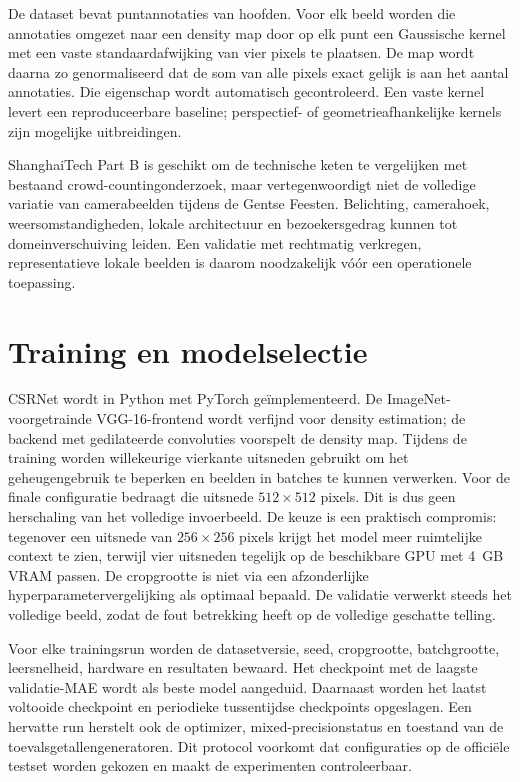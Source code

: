 De dataset bevat puntannotaties van hoofden. Voor elk beeld worden die annotaties omgezet naar een density map door op elk punt een Gaussische kernel met een vaste standaardafwijking van vier pixels te plaatsen. De map wordt daarna zo genormaliseerd dat de som van alle pixels exact gelijk is aan het aantal annotaties. Die eigenschap wordt automatisch gecontroleerd. Een vaste kernel levert een reproduceerbare baseline; perspectief- of geometrieafhankelijke kernels zijn mogelijke uitbreidingen.

ShanghaiTech Part B is geschikt om de technische keten te vergelijken met bestaand crowd-countingonderzoek, maar vertegenwoordigt niet de volledige variatie van camerabeelden tijdens de Gentse Feesten. Belichting, camerahoek, weersomstandigheden, lokale architectuur en bezoekersgedrag kunnen tot domeinverschuiving leiden. Een validatie met rechtmatig verkregen, representatieve lokale beelden is daarom noodzakelijk vóór een operationele toepassing.

\section{Training en modelselectie}

CSRNet wordt in Python met PyTorch geïmplementeerd. De ImageNet-voorgetrainde VGG-16-frontend wordt verfijnd voor density estimation; de backend met gedilateerde convoluties voorspelt de density map. Tijdens de training worden willekeurige vierkante uitsneden gebruikt om het geheugengebruik te beperken en beelden in batches te kunnen verwerken. Voor de finale configuratie bedraagt die uitsnede \(512 \times 512\) pixels. Dit is dus geen herschaling van het volledige invoerbeeld. De keuze is een praktisch compromis: tegenover een uitsnede van \(256 \times 256\) pixels krijgt het model meer ruimtelijke context te zien, terwijl vier uitsneden tegelijk op de beschikbare GPU met 4~GB VRAM passen. De cropgrootte is niet via een afzonderlijke hyperparametervergelijking als optimaal bepaald. De validatie verwerkt steeds het volledige beeld, zodat de fout betrekking heeft op de volledige geschatte telling.

Voor elke trainingsrun worden de datasetversie, seed, cropgrootte, batchgrootte, leersnelheid, hardware en resultaten bewaard. Het checkpoint met de laagste validatie-MAE wordt als beste model aangeduid. Daarnaast worden het laatst voltooide checkpoint en periodieke tussentijdse checkpoints opgeslagen. Een hervatte run herstelt ook de optimizer, mixed-precisionstatus en toestand van de toevalsgetallengeneratoren. Dit protocol voorkomt dat configuraties op de officiële testset worden gekozen en maakt de experimenten controleerbaar.

